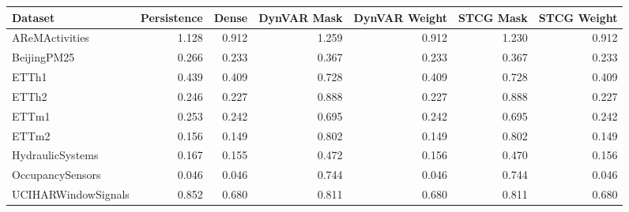 \begin{tabular}{lrrrrrr}
\toprule
Dataset & Persistence & Dense & DynVAR Mask & DynVAR Weight & STCG Mask & STCG Weight \\
\midrule
AReMActivities & 1.128 & 0.912 & 1.259 & 0.912 & 1.230 & 0.912 \\
BeijingPM25 & 0.266 & 0.233 & 0.367 & 0.233 & 0.367 & 0.233 \\
ETTh1 & 0.439 & 0.409 & 0.728 & 0.409 & 0.728 & 0.409 \\
ETTh2 & 0.246 & 0.227 & 0.888 & 0.227 & 0.888 & 0.227 \\
ETTm1 & 0.253 & 0.242 & 0.695 & 0.242 & 0.695 & 0.242 \\
ETTm2 & 0.156 & 0.149 & 0.802 & 0.149 & 0.802 & 0.149 \\
HydraulicSystems & 0.167 & 0.155 & 0.472 & 0.156 & 0.470 & 0.156 \\
OccupancySensors & 0.046 & 0.046 & 0.744 & 0.046 & 0.744 & 0.046 \\
UCIHARWindowSignals & 0.852 & 0.680 & 0.811 & 0.680 & 0.811 & 0.680 \\
\bottomrule
\end{tabular}
